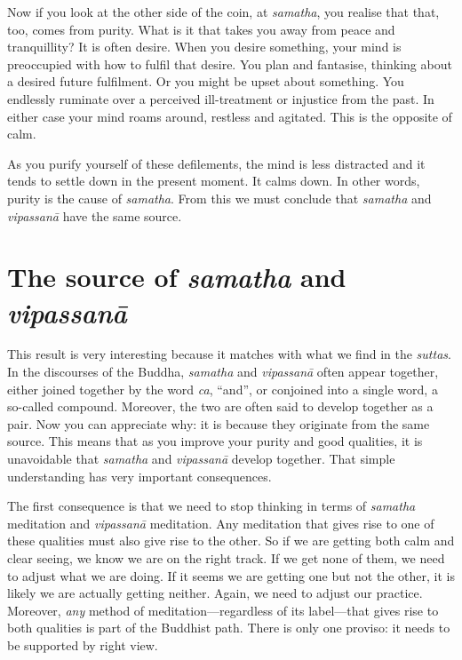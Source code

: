 \documentclass[12pt,openany]{book}
\begin{document}
Now if you look at the other side of the coin, at \textit{samatha}, you realise that that, too, comes from purity. What is it that takes you away from peace and tranquillity? It is often desire. When you desire something, your mind is preoccupied with how to fulfil that desire. You plan and fantasise, thinking about a desired future fulfilment. Or you might be upset about something. You endlessly ruminate over a perceived ill-treatment or injustice from the past. In either case your mind roams around, restless and agitated. This is the opposite of calm.

As you purify yourself of these defilements, the mind is less distracted and it tends to settle down in the present moment. It calms down. In other words, purity is the cause of \textit{samatha}. From this we must conclude that \textit{samatha} and \textit{vipassanā} have the same source.

\chapter*{The source of \textit{samatha} and \textit{vipassanā}}

This result is very interesting because it matches with what we find in the \textit{suttas}. In the discourses of the Buddha, \textit{samatha} and \textit{vipassanā} often appear together, either joined together by the word \textit{ca}, “and”, or conjoined into a single word, a so-called compound. Moreover, the two are often said to develop together as a pair. Now you can appreciate why: it is because they originate from the same source. This means that as you improve your purity and good qualities, it is unavoidable that \textit{samatha} and \textit{vipassanā} develop together. That simple understanding has very important consequences.

The first consequence is that we need to stop thinking in terms of \textit{samatha} meditation and \textit{vipassanā} meditation. Any meditation that gives rise to one of these qualities must also give rise to the other. So if we are getting both calm and clear seeing, we know we are on the right track. If we get none of them, we need to adjust what we are doing. If it seems we are getting one but not the other, it is likely we are actually getting neither. Again, we need to adjust our practice. Moreover, \textit{any} method of meditation—regardless of its label—that gives rise to both qualities is part of the Buddhist path. There is only one proviso: it needs to be supported by right view.
\end{document}
